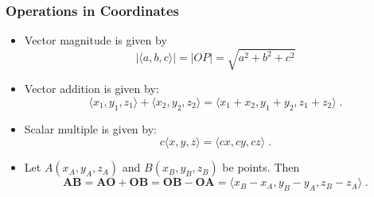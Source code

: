 \begin{frame}
\frametitle{Operations in Coordinates}
\begin{itemize}
\item<1-> Vector magnitude is given by 
\[
|\langle a, b, c \rangle| = |OP| = \sqrt{a^2+b^2+c^2}
\]
\item<2-> Vector addition is given by:
\[
\langle x_1,y_1,z_1 \rangle + \langle x_2, y_2,z_2\rangle = \langle x_1+x_2, y_1+y_2, z_1+z_2\rangle\; .
\]
\item<3-> Scalar multiple is given by:
\[
c\langle x, y, z\rangle = \langle cx, cy, cz\rangle\; .
\]
\item<4-> Let $A(x_A, y_A, z_A)$ and $B(x_B, y_B, z_B)$ be points. Then
\[
\bm{AB} = \bm{AO} +\bm{OB} = \bm{OB} - \bm{OA} = \langle x_B-x_A, y_B-y_A, z_B-z_A\rangle \; .
\]
\end{itemize}

\end{frame}